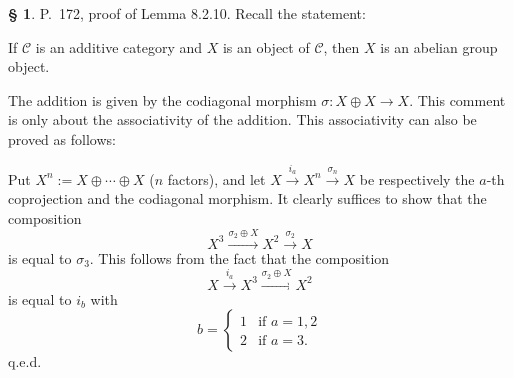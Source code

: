 \documentclass[12pt]{article}%
\theoremstyle{remark}
\theoremstyle{definition}
\newtheorem{s}[thm]{\S}%
\newcommand{\C}{\mathcal C}
\newcommand{\xr}{\xrightarrow}
\begin{document}
%

\begin{s} 
P.~172, proof of Lemma 8.2.10. Recall the statement: 

If $\C$ is an additive category and $X$ is an object of $\C$, then $X$ is an abelian group object. 

The addition is given by the codiagonal morphism $\sigma:X\oplus X\to X$. This comment is only about the associativity of the addition. This associativity can also be proved as follows:

Put $X^n:=X\oplus\cdots\oplus X$ ($n$ factors), and let $X\xr{i_a}X^n\xr{\sigma_n}X$ be respectively the $a$-th coprojection and the codiagonal morphism. It clearly suffices to show that the composition 
$$
X^3\xr{\sigma_2\oplus X}X^2\xr{\sigma_2}X
$$ 
is equal to $\sigma_3$. This follows from the fact that the composition 
$$
X\xr{i_a}X^3\xr{\sigma_2\oplus X}X^2
$$ 
is equal to $i_b$ with 
$$
b=\begin{cases}1&\text{if }a=1,2\\2&\text{if }a=3.\end{cases}
$$ 
q.e.d.
\end{s}

%
\end{document}
